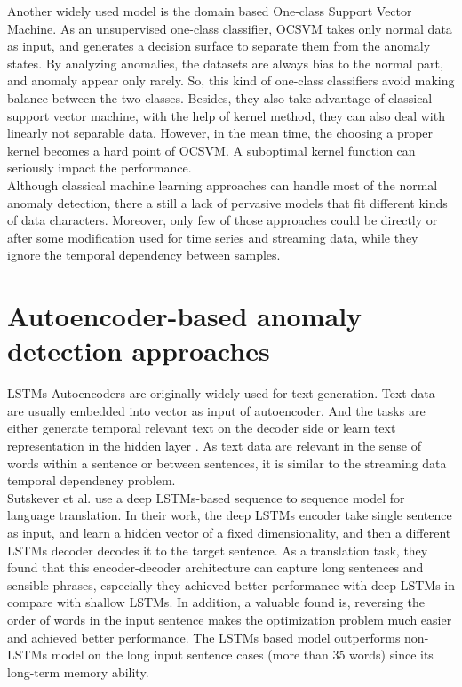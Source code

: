 Another widely used model is the domain based One-class Support Vector Machine. As an unsupervised one-class classifier, OCSVM takes only normal data as input, and generates a decision surface to separate them from the anomaly states.  By analyzing anomalies, the datasets are always bias to the normal part, and anomaly appear only rarely. So, this kind of one-class classifiers avoid making balance between the two classes. Besides, they also take advantage of classical support vector machine, with the help of kernel method, they can also deal with linearly not separable data. However, in the mean time, the choosing a proper kernel becomes a hard point of OCSVM. A suboptimal kernel function can seriously impact the performance.\\
Although classical machine learning approaches can handle most of the normal anomaly detection, there a still a lack of pervasive models that fit different kinds of data characters. Moreover, only few of those approaches could be directly or after some modification used for time series and streaming data, while they ignore the temporal dependency between samples.



\section{Autoencoder-based anomaly detection approaches}
\label{sec:Autoencoder-based anomaly detection approaches}

LSTMs-Autoencoders are originally widely used for text generation. Text data are usually embedded into vector as input of autoencoder. And the tasks are either generate temporal relevant text on the decoder side or learn text representation in the hidden layer \cite{phraserepresentation}. As text data are relevant in the sense of words within a sentence or between sentences, it is similar to the streaming data temporal dependency problem.\\

Sutskever et al. \cite{seq2seq} use a deep LSTMs-based sequence to sequence model for language translation. In their work, the deep LSTMs encoder take single sentence as input, and learn a hidden vector of a fixed dimensionality, and then a different LSTMs decoder decodes it to the target sentence.  As a translation task, they found that this encoder-decoder architecture can capture long sentences and sensible phrases, especially they achieved better performance with deep LSTMs in compare with shallow LSTMs. In addition, a valuable found is, reversing the order of words in the input sentence makes the optimization problem much easier and achieved better performance. The LSTMs based model outperforms non-LSTMs model on the long input sentence cases (more than 35 words) since its long-term memory ability.\\

